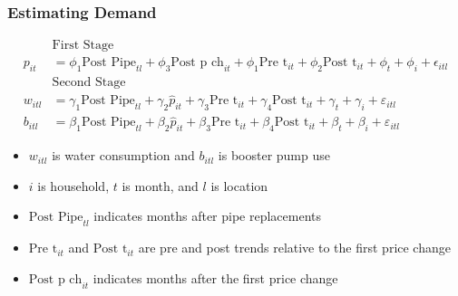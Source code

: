 \documentclass[aspectratio=32]{beamer}
\begin{document}
\begin{frame}
\frametitle{Estimating Demand}


\begin{align*}
&\text{First Stage}\\
p_{it} &= \phi_1 \text{Post Pipe}_{tl}  +  \phi_3 \text{Post p ch}_{it} +  \phi_1\text{Pre t}_{it} +\phi_2\text{Post t}_{it} +  \phi_t +  \phi_i + \epsilon_{itl}  \\[.5em]
&\text{Second Stage}\\
w_{itl} &= \gamma_1  \text{Post Pipe}_{tl} + \gamma_2  \hat{p}_{it} + \gamma_3\text{Pre t}_{it} +\gamma_4\text{Post t}_{it} +    \gamma_t +  \gamma_i +  \varepsilon_{itl} \\
b_{itl} &= \beta_1  \text{Post Pipe}_{tl} + \beta_2  \hat{p}_{it} + \beta_3\text{Pre t}_{it} +\beta_4\text{Post t}_{it} +    \beta_t +  \beta_i +  \varepsilon_{itl} 
\end{align*}
\begin{itemize}
  \item $w_{itl}$ is water consumption and $b_{itl}$ is booster pump use
  \item $i$ is household, $t$ is month, and $l$ is location
  \item $\text{Post Pipe}_{tl}$ indicates months after pipe replacements
  \item $\text{Pre t}_{it}$ and $\text{Post t}_{it}$ are pre and post trends relative to the first price change
  \item $\text{Post p ch}_{it}$ indicates months after the first price change
\end{itemize}

\end{frame}
\end{document}
